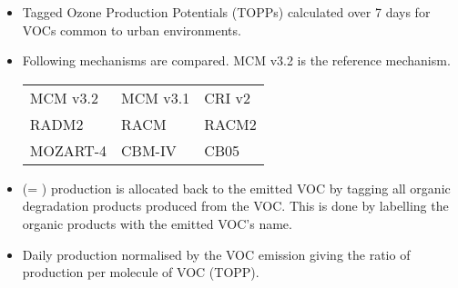 \begin{BlueBox}
    \vskip-1cm
    \begin{block}{}
        \begin{itemize} 
            \item Tagged Ozone Production Potentials (TOPPs) \citep{Butler:2011} calculated over 7 days for VOCs common to urban environments. \vspace{5mm}
            \item Following mechanisms are compared. MCM v3.2 is the reference mechanism.
                {
                     \normalsize
                    \begin{table}[htp]
                        \begin{center}
                            \begin{tabular}{P{7cm}P{7cm}P{7cm}}
                                MCM v3.2 & MCM v3.1 & CRI v2 \\
                                RADM2 & RACM & RACM2 \\
                                MOZART-4 & CBM-IV & CB05
                            \end{tabular}
                        \end{center}
                    \end{table}
                } \vspace{5mm}
            \item {} (= ) production is allocated back to the emitted VOC by tagging all organic degradation products produced from the VOC. This is done by labelling the organic products with the emitted VOC's name. \vspace{5mm}
            \item Daily  production normalised by the VOC emission giving the ratio of  production per molecule of VOC (TOPP).
        \end{itemize}
    \end{block}
\end{BlueBox}
